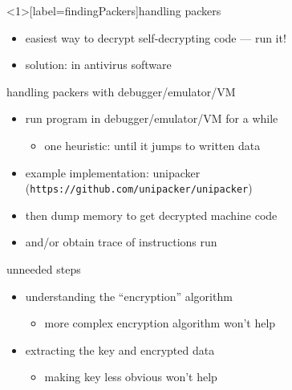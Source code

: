 
\begin{frame}<1>[label=findingPackers]{handling packers}
    \begin{itemize}
    \item easiest way to decrypt self-decrypting code --- run it!
    \item solution:  in antivirus software
    \end{itemize}
\end{frame}

\begin{frame}{handling packers with debugger/emulator/VM}
    \begin{itemize}
    \item run program in debugger/emulator/VM for a while
        \begin{itemize}
        \item one heuristic: until it jumps to written data
        \end{itemize}
    \item example implementation: unipacker (\texttt{https://github.com/unipacker/unipacker})
    \vspace{.5cm}
    \item then dump memory to get decrypted machine code
    \item and/or obtain trace of instructions run
    \end{itemize}
\end{frame}

\begin{frame}{unneeded steps}
    \begin{itemize}
    \item understanding the ``encryption'' algorithm
        \begin{itemize}
        \item more complex encryption algorithm won't help
        \end{itemize}
    \item extracting the key and encrypted data
        \begin{itemize}
        \item making key less obvious won't help
        \end{itemize}
    \end{itemize}
\end{frame}


